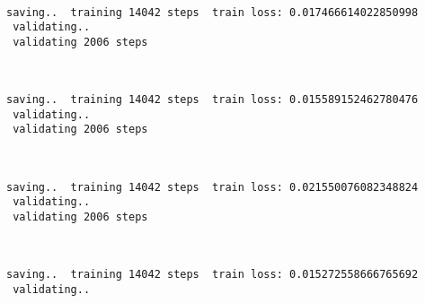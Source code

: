 \documentclass[11pt]{article}
\begin{document}
    \begin{center}
    \end{center}
    { \hspace*{\fill} \\}
    
    \begin{Verbatim}[commandchars=\\\{\}]
 saving..  training 14042 steps  train loss: 0.017466614022850998
 validating..
 validating 2006 steps
    \end{Verbatim}

    \begin{center}
    \end{center}
    { \hspace*{\fill} \\}
    
    \begin{Verbatim}[commandchars=\\\{\}]
 saving..  training 14042 steps  train loss: 0.015589152462780476
 validating..
 validating 2006 steps
    \end{Verbatim}

    \begin{center}
    \end{center}
    { \hspace*{\fill} \\}
    
    \begin{Verbatim}[commandchars=\\\{\}]
 saving..  training 14042 steps  train loss: 0.021550076082348824
 validating..
 validating 2006 steps
    \end{Verbatim}

    \begin{center}
    \end{center}
    { \hspace*{\fill} \\}
    
    \begin{Verbatim}[commandchars=\\\{\}]
 saving..  training 14042 steps  train loss: 0.015272558666765692
 validating..

    \end{Verbatim}
\end{document}
